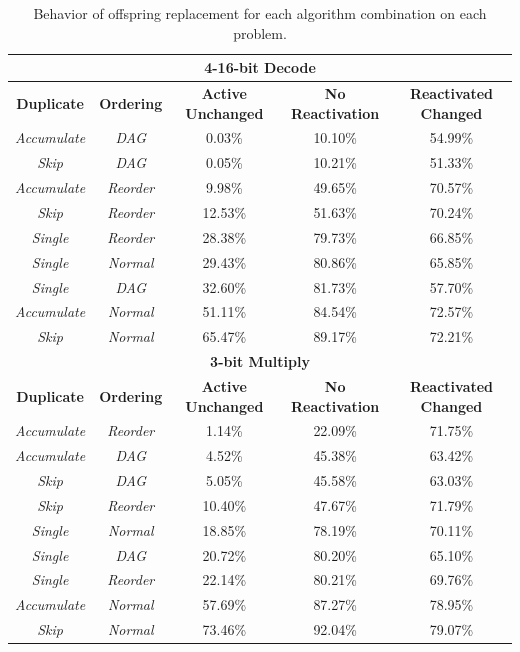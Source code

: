 \documentclass[journal]{IEEEtran}
\begin{document}
\begin{table}
\begin{tabular}{|c|c|c|c|c|}
  \multicolumn{5}{|c|}{\textbf{4-16-bit Decode}} \\ \hline

\textbf{Duplicate} & \textbf{Ordering} & \textbf{Active Unchanged} & \textbf{No Reactivation} & \textbf{Reactivated Changed} \\ \hline
 \emph{Accumulate} &     \emph{DAG} & 0.03\% & 10.10\% & 54.99\% \\ \hline
       \emph{Skip} &     \emph{DAG} & 0.05\% & 10.21\% & 51.33\% \\ \hline
 \emph{Accumulate} & \emph{Reorder} & 9.98\% & 49.65\% & 70.57\% \\ \hline
       \emph{Skip} & \emph{Reorder} & 12.53\% & 51.63\% & 70.24\% \\ \hline
     \emph{Single} & \emph{Reorder} & 28.38\% & 79.73\% & 66.85\% \\ \hline
     \emph{Single} &  \emph{Normal} & 29.43\% & 80.86\% & 65.85\% \\ \hline
     \emph{Single} &     \emph{DAG} & 32.60\% & 81.73\% & 57.70\% \\ \hline
 \emph{Accumulate} &  \emph{Normal} & 51.11\% & 84.54\% & 72.57\% \\ \hline
   \rowcolor{Gray}
       \emph{Skip} &  \emph{Normal} & 65.47\% & 89.17\% & 72.21\% \\ \hline\hline

  \multicolumn{5}{|c|}{\textbf{3-bit Multiply}} \\ \hline

\textbf{Duplicate} & \textbf{Ordering} & \textbf{Active Unchanged} & \textbf{No Reactivation} & \textbf{Reactivated Changed} \\ \hline
 \emph{Accumulate} & \emph{Reorder} & 1.14\% & 22.09\% & 71.75\% \\ \hline
 \emph{Accumulate} &     \emph{DAG} & 4.52\% & 45.38\% & 63.42\% \\ \hline
       \emph{Skip} &     \emph{DAG} & 5.05\% & 45.58\% & 63.03\% \\ \hline
       \emph{Skip} & \emph{Reorder} & 10.40\% & 47.67\% & 71.79\% \\ \hline
     \emph{Single} &  \emph{Normal} & 18.85\% & 78.19\% & 70.11\% \\ \hline
     \emph{Single} &     \emph{DAG} & 20.72\% & 80.20\% & 65.10\% \\ \hline
     \emph{Single} & \emph{Reorder} & 22.14\% & 80.21\% & 69.76\% \\ \hline
 \emph{Accumulate} &  \emph{Normal} & 57.69\% & 87.27\% & 78.95\% \\ \hline
   \rowcolor{Gray}
       \emph{Skip} &  \emph{Normal} & 73.46\% & 92.04\% & 79.07\% \\ \hline
	\end{tabular}
	\caption{Behavior of offspring replacement for each algorithm combination
	         on each problem.}
	\label{tab:reactivate}
\end{table}
\end{document}
